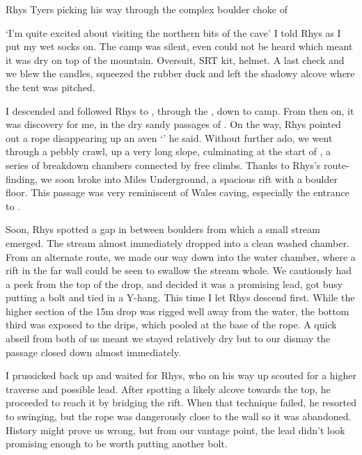  \begin{marginfigure}
\checkoddpage \ifoddpage \forcerectofloat \else \forceversofloat \fi
\centering
 \caption{Rhys Tyers picking his way through the complex boulder choke of \protect{} }
 \label{smash}
\end{marginfigure}

`I'm quite excited about visiting the northern bits of the cave' I told Rhys as I put my wet socks on. The camp was silent, even  could not be heard which meant it was dry on top of the mountain. Oversuit, SRT kit, helmet. A last check and we blew the candles, squeezed the rubber duck and left the shadowy alcove where the tent was pitched.

I descended  and followed Rhys to , through the , down  to  camp. From then on, it was discovery for me, in the dry sandy passages of . On the way, Rhys pointed out a rope disappearing up an aven `' he said. Without further ado, we went through a pebbly crawl, up a very long slope, culminating at the start of , a series of breakdown chambers connected by free climbs. Thanks to Rhys's route-finding, we soon broke into Miles Underground, a spacious rift with a boulder floor. This passage was very reminiscent of Wales caving, especially the entrance to .

Soon, Rhys spotted a gap in between boulders from which a small stream emerged. The stream almost immediately dropped into a clean washed chamber. From an alternate route, we made our way down into the water chamber, where a rift in the far wall could be seen to swallow the stream whole. We cautiously had a peek from the top of the drop, and decided it was a promising lead, got busy putting a bolt and tied in a Y-hang. This time I let Rhys descend first. While the higher section of the 15m drop was rigged well away from the water, the bottom third was exposed to the drips, which pooled at the base of the rope. A quick abseil from both of us meant we stayed relatively dry but to our dismay the passage closed down almost immediately. 

I prussicked back up and waited for Rhys, who on his way up scouted for a higher traverse and possible lead. After spotting a likely alcove towards the top, he proceeded to reach it by bridging the rift. When that technique failed, he resorted to swinging, but the rope was dangerously close to the wall so it was abandoned. History might prove us wrong, but from our vantage point, the lead didn't look promising enough to be worth putting another bolt. 

